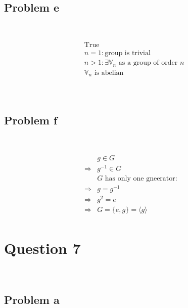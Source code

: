 \documentclass{article}
\begin{document}
~

\subsection*{Problem e}

~

\begin{equation*}
    \begin{split}
        &\text{True}\\
        &n=1:\text{group is trivial}\\
        &n>1:\exists \mathbb{V} _n\text{ as a group of order }n\\
        &\mathbb{V}_n\text{ is abelian}\\
    \end{split}
\end{equation*}

~

\subsection*{Problem f}

~

\begin{equation*}
    \begin{split}
        &g\in G\\
        \Rightarrow&g^{-1}\in G\\
        &G\text{ has only one gneerator}:\\
        \Rightarrow&g=g^{-1}\\
        \Rightarrow&g^{2}=e\\
        \Rightarrow&G=\{e,g\}=\langle g\rangle\\
    \end{split}
\end{equation*}

\newpage

\section*{Question 7}

~

\subsection*{Problem a}

~
\end{document}
